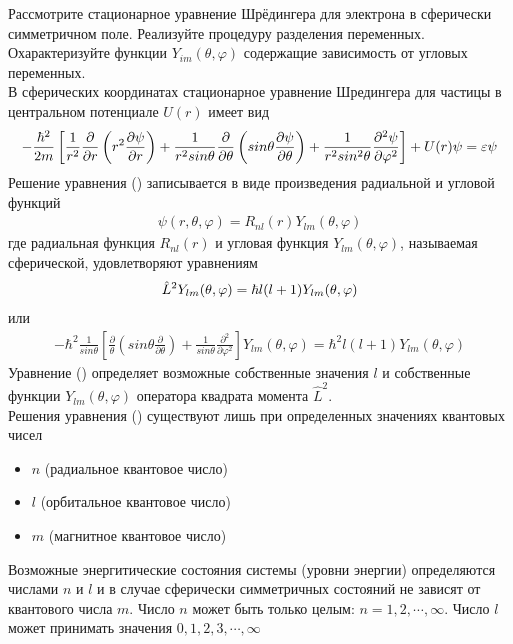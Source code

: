 \documentclass[__main__.tex]{subfiles}
\begin{document}
Рассмотрите стационарное уравнение Шрёдингера для электрона в сферически симметричном поле. Реализуйте процедуру разделения переменных. Охарактеризуйте функции $Y_{im}(\theta,\varphi)$ содержащие зависимость от угловых переменных.\\

В сферических координатах стационарное уравнение Шредингера для частицы в центральном потенциале $U(r)$ имеет вид
\begin{gather}
    \llabel{k37-1}
    -\frac{\hbar^2}{2m}\left[\frac{1}{r^2}\frac{\partial}{\partial r}\left(r^2\frac{\partial \psi}{\partial r}\right)+\frac{1}{r^2sin\theta}\frac{\partial}{\partial\theta}\left(sin\theta\frac{\partial \psi}{\partial \theta}\right)+\frac{1}{r^2sin^2\theta}\frac{\partial^2\psi}{\partial \varphi^2}\right]+U(r)\psi = \varepsilon\psi
\end{gather}
Решение уравнения () записывается в виде произведения радиальной и угловой функций
\begin{gather*}
    \psi(r,\theta,\varphi) = R_{nl}(r)Y_{lm}(\theta,\varphi)
\end{gather*}
где радиальная функция $R_{nl}(r)$ и угловая функция $Y_{lm}(\theta,\varphi)$, называемая сферической, удовлетворяют уравнениям
\begin{gather}
    \llabel{k37-2}
    \hat{L}^2Y_{lm}(\theta,\varphi) = \hbar l(l+1)Y_{lm}(\theta,\varphi)
\end{gather}
или
\begin{gather*}
    -\hbar^2\frac{1}{sin\theta}\left[\frac{\partial}{\theta}\left(sin\theta\frac{\partial}{\partial\theta}\right)+\frac{1}{sin\theta}\frac{\partial^2}{\partial\varphi^2}\right]Y_{lm}(\theta,\varphi) = \hbar^2 l(l+1)Y_{lm}(\theta,\varphi)
\end{gather*}
Уравнение () определяет возможные собственные значения $l$ и собственные функции $Y_{lm}(\theta,\varphi)$ оператора квадрата момента $\hat{L}^2$.\\
Решения уравнения () существуют лишь при определенных значениях квантовых чисел
\begin{itemize}
    \item $n$ (радиальное квантовое число)
    \item $l$ (орбитальное квантовое число)
    \item $m$ (магнитное квантовое число)
\end{itemize}
Возможные энергитические состояния системы (уровни энергии) определяются числами $n$ и $l$ и в случае сферически симметричных состояний не зависят от квантового числа $m$. Число $n$ может быть только целым: $n = 1,2,\cdots, \infty$. Число $l$ может принимать значения $0,1,2,3,\cdots, \infty$
\end{document}
